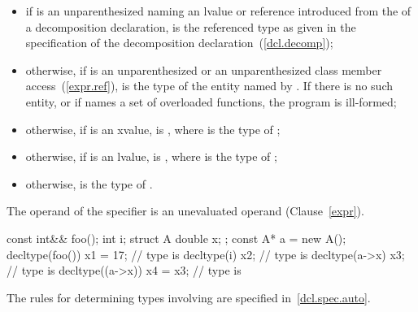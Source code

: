 \begin{itemize}
\item if  is an unparenthesized  naming an lvalue or
reference introduced from the  of a decomposition declaration,
 is the referenced type as given in the specification of the decomposition
declaration~(\ref{dcl.decomp});

\item otherwise, if  is an unparenthesized  or
an unparenthesized
class
member access~(\ref{expr.ref}),  is the
type of the entity named by . If there is no such entity, or
if  names a set of overloaded functions, the program is
ill-formed;

\item otherwise, if  is
an xvalue,  is , where  is the type
of ;

\item otherwise, if  is an lvalue, 
is , where  is the type of ;

\item otherwise,  is the type of .
\end{itemize}

The operand of the  specifier is an unevaluated
operand (Clause~\ref{expr}).

\begin{example}
\begin{codeblock}
const int&& foo();
int i;
struct A { double x; };
const A* a = new A();
decltype(foo()) x1 = 17;        // type is 
decltype(i) x2;                 // type is 
decltype(a->x) x3;              // type is 
decltype((a->x)) x4 = x3;       // type is 
\end{codeblock}
\end{example}
\begin{note}
The rules for determining types involving  are specified
in~\ref{dcl.spec.auto}.
\end{note}

